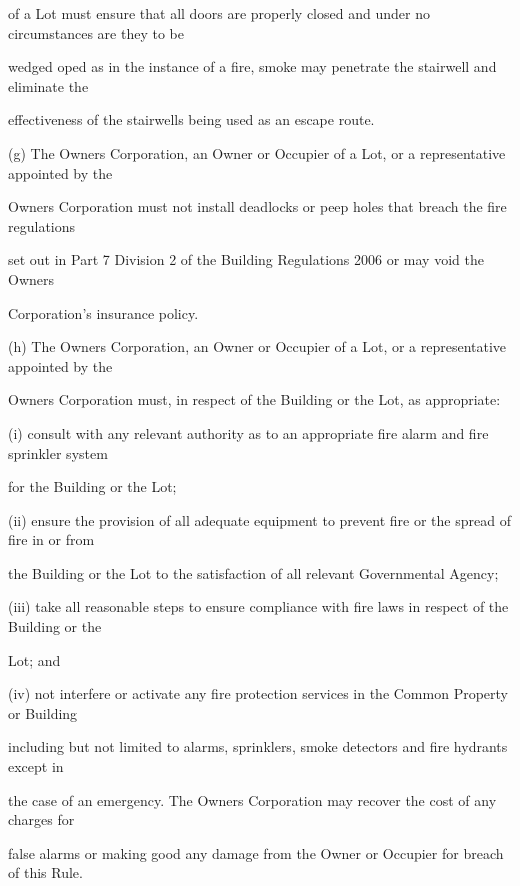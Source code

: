 \documentclass{article}
\begin{document}
{\fontsize{10.02}{1}of a Lot must ensure that all doors are properly closed and under no circumstances are they to be }

{\fontsize{10.02}{1}wedged oped as in the instance of a fire, smoke may penetrate the stairwell and eliminate the }

{\fontsize{10.02}{1}effectiveness of the stairwells being used as an escape route. }

{\fontsize{9.962}{1}(g) The Owners Corporation, an Owner or Occupier of a Lot, or a representative appointed by the }

{\fontsize{10.02}{1}Owners Corporation must not install deadlocks or peep holes that breach the fire regulations }

{\fontsize{10.02}{1}set out in Part 7 Division 2 of the Building Regulations 2006 or may void the Owners }

{\fontsize{10.02}{1}Corporation’s insurance policy. }

{\fontsize{9.962}{1}(h) The Owners Corporation, an Owner or Occupier of a Lot, or a representative appointed by the }

{\fontsize{10.02}{1}Owners Corporation must, in respect of the Building or the Lot, as appropriate: }

{\fontsize{9.962}{1}(i) consult with any relevant authority as to an appropriate fire alarm and fire sprinkler system }

{\fontsize{10.02}{1}for the Building or the Lot; }

{\fontsize{9.962}{1}(ii) ensure the provision of all adequate equipment to prevent fire or the spread of fire in or from }

{\fontsize{10.02}{1}the Building or the Lot to the satisfaction of all relevant Governmental Agency; }

{\fontsize{9.962}{1}(iii) take all reasonable steps to ensure compliance with fire laws in respect of the Building or the }

{\fontsize{10.02}{1}Lot; and }

{\fontsize{9.962}{1}(iv) not interfere or activate any fire protection services in the Common Property or Building }

{\fontsize{10.02}{1}including but not limited to alarms, sprinklers, smoke detectors and fire hydrants except in }

{\fontsize{10.02}{1}the case of an emergency. The Owners Corporation may recover the cost of any charges for }

{\fontsize{10.02}{1}false alarms or making good any damage from the Owner or Occupier for breach of this Rule. }
\end{document}
